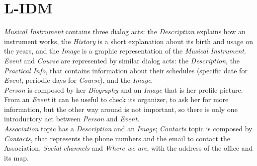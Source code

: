 \documentclass[../../DD.tex]{subfiles}
\begin{document}
\section{L-IDM}
	\textit{Musical Instrument} contains three dialog acts: the \textit{Description} explains how an instrument works, the \textit{History} is a short explanation about its birth and usage on the years, and the \textit{Image} is a graphic representation of the \textit{Musical Instrument}. \textit{Event} and \textit{Course} are represented by similar dialog acts: the \textit{Description}, the \textit{Practical Info}, that contains information about their schedules (specific date for \textit{Event}, periodic days for \textit{Course}), and the \textit{Image}.\\
	\textit{Person} is composed by her \textit{Biography} and an \textit{Image} that is her profile picture. From an \textit{Event} it can be useful to check its organizer, to ask her for more information, but the other way around is not important, so there is only one introductory act between \textit{Person} and \textit{Event}.\\
	\textit{Association} topic has a \textit{Description} and an \textit{Image}; \textit{Contacts} topic is composed by \textit{Contacts}, that represents the phone numbers and the email to contact the Association, \textit{Social channels} and \textit{Where we are}, with the address of the office and its map.
\end{document}
